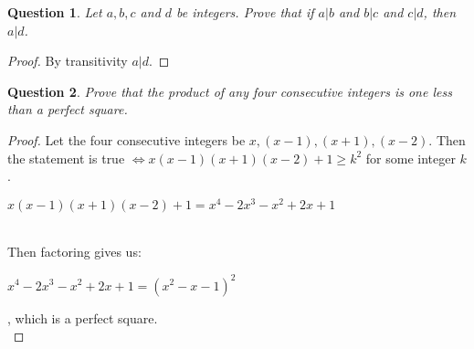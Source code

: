\documentclass[11pt,oneside]{article}
\newtheorem{question}{Question}
\begin{document}
\begin{question}
	Let $a, b, c$ and $d$ be integers. Prove that if $a|b$ and $b|c$ and $c|d$, then $a|d$.
\end{question}
\begin{proof}
	By transitivity $a|d$.
\end{proof}

\begin{question}
	Prove that the product of any four consecutive integers is one less than a perfect square.
\end{question}
\begin{proof}
	Let the four consecutive integers be $x, (x-1), (x+1), (x-2)$. Then the statement is true $\iff x(x-1)(x+1)(x-2)+1 \geq k^2$ for some integer $k$.
	\centerline{$x(x-1)(x+1)(x-2)+1 = x^4-2x^3-x^2+2x+1$}\\
	Then factoring gives us:\\
	\centerline{$x^4-2x^3-x^2+2x+1 = (x^2 - x -1)^2$}, which is a perfect square.\\
\end{proof}
\end{document}
